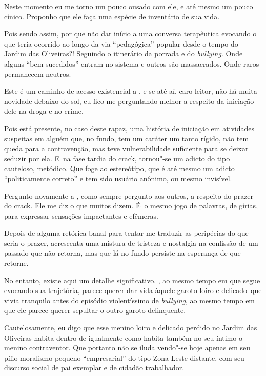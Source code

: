 Neste momento eu me torno um pouco ousado com ele, e até mesmo um pouco
cínico. Proponho que ele faça uma espécie de inventário de sua vida.

Pois sendo assim, por que não dar início a uma conversa terapêutica
evocando o que teria ocorrido ao longo da via ``pedagógica'' popular
desde o tempo do Jardim das Oliveiras?! Seguindo o itinerário da porrada
e do \emph{bullying}. Onde alguns ``bem sucedidos'' entram no sistema e outros
são massacrados. Onde raros permanecem neutros.

Este é um caminho de acesso existencial a , e se até aí, caro leitor,
não há muita novidade debaixo do sol, eu fico me perguntando melhor a
respeito da iniciação dele na droga e no crime.

Pois está presente, no caso deste rapaz, uma história de iniciação em
atividades suspeitas em alguém que, no fundo, tem um caráter um tanto
rígido, não tem queda para a contravenção, mas teve vulnerabilidade
suficiente para se deixar seduzir por ela. E~na fase tardia do crack, 
tornou"-se um adicto do tipo cauteloso, metódico. Que foge ao
estereótipo, que é até mesmo um adicto ``politicamente correto'' e tem
sido usuário anônimo, ou mesmo invisível.

Pergunto novamente a , como sempre pergunto aos outros, a respeito do
prazer do crack. Ele me diz o que muitos dizem. É~o mesmo jogo de
palavras, de gírias, para expressar sensações impactantes e efêmeras.

Depois de alguma retórica banal para tentar me traduzir as peripécias do
que seria o prazer,  acrescenta uma mistura de tristeza e nostalgia na
confissão de um passado que não retorna, mas que lá no fundo persiste na
esperança de que retorne.

No entanto, existe aqui um detalhe significativo. , ao mesmo tempo em
que segue evocando sua trajetória, parece querer dar vida àquele garoto
loiro e delicado~que vivia tranquilo antes do episódio violentíssimo de
\emph{bullying}, ao mesmo tempo em que ele parece querer sepultar o
outro garoto  delinquente.

Cautelosamente, eu digo que esse menino loiro e delicado perdido no
Jardim das Oliveiras habita dentro de  igualmente como habita também
no seu íntimo o menino contraventor. Que  portanto não se iluda
vendo"-se hoje apenas em seu pífio moralismo pequeno ``empresarial'' do
tipo Zona Leste distante, com seu discurso social de pai exemplar e de
cidadão trabalhador.

